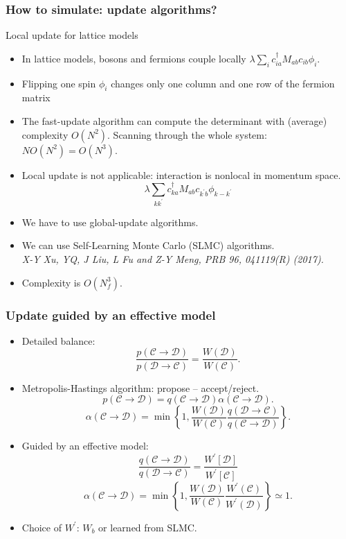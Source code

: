 \documentclass[xcolor=table, 10pt, aspectratio=43]{beamer}
\begin{document}
\begin{frame}
  \frametitle{How to simulate: update algorithms?}
  \begin{block}{Local update for lattice models}
    \begin{itemize}
      \item In lattice models, bosons and fermions couple locally $\lambda\sum_ic_{ia}^\dagger M_{ab}c_{ib}\phi_i$.
      \item Flipping one spin $\phi_i$ changes only one column and one row of the fermion matrix
      \item The fast-update algorithm can compute the determinant with (average) complexity $O(N^2)$. Scanning through the whole system: $NO(N^2)=O(N^3)$.
    \end{itemize}
  \end{block}
  \begin{itemize}
    \item Local update is not applicable: interaction is nonlocal in momentum space.
    \[\lambda\sum_{kk^\prime}c_{ka}^\dagger M_{ab}c_{k^\prime b}\phi_{k-k^\prime}\]
    \item We have to use global-update algorithms.
    \item We can use Self-Learning Monte Carlo (SLMC) algorithms.\\
    \emph{\small X-Y Xu, YQ, J Liu, L Fu and Z-Y Meng, PRB 96, 041119(R) (2017).}
    \item Complexity is $O(N_f^3)$.
  \end{itemize}
\end{frame}

\begin{frame}
  \frametitle{Update guided by an effective model}
  \begin{itemize}
    \item Detailed balance:
    \[\frac{p(\mathcal C\rightarrow\mathcal D)}{p(\mathcal D\rightarrow\mathcal C)}=\frac{W(\mathcal D)}{W(\mathcal C)}.\]
    \item Metropolis-Hastings algorithm: propose -- accept/reject.
    \[p(\mathcal C\rightarrow\mathcal D) = q(\mathcal C\rightarrow\mathcal D)
    \alpha(\mathcal C\rightarrow\mathcal D).\]
    \[\alpha(\mathcal C\rightarrow\mathcal D) =
    \min\left\{1, \frac{W(\mathcal D)}{W(\mathcal C)}
    \frac{q(\mathcal D\rightarrow\mathcal C)}
    {q(\mathcal C\rightarrow\mathcal D)}\right\}.\]
    \item Guided by an effective model:
    \[\frac{q(\mathcal C\rightarrow\mathcal D)}
    {q(\mathcal D\rightarrow\mathcal C)}
    =\frac{W^\prime[\mathcal D]}{W^\prime[\mathcal C]}\]
    \[\alpha(\mathcal C\rightarrow \mathcal D)=\min\left\{1, \frac{W(\mathcal D)}{W(\mathcal C)}
    \frac{W^\prime(\mathcal C)}{W^\prime(\mathcal D)}\right\}\simeq1.\]
    \item Choice of $W^\prime$: $W_b$ or learned from SLMC.
  \end{itemize}
\end{frame}
\end{document}
